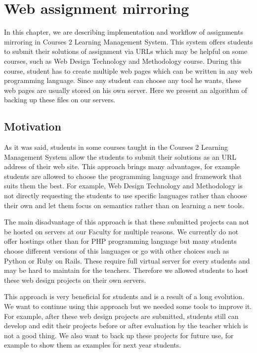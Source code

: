\chapter{Web assignment mirroring}
\label{sec:mirroring}

In this chapter, we are describing implementation and workflow of assignments mirroring in Courses 2 Learning Management System. This system offers students to submit their solutions of assignment via URLs which may be helpful on some courses, such as Web Design Technology and Methodology course. During this course, student has to create multiple web pages which can be written in any web programming language. Since any student can choose any tool he wants, these web pages are usually stored on his own server. Here we present an algorithm of backing up these files on our servers.

\section{Motivation}
As it was said, students in some courses taught in the Courses 2 Learning Management System allow the students to submit their solutions as an URL address of their web site. This approach brings many advantages, for example students are allowed to choose the programming language and framework that suits them the best. For example, Web Design Technology and Methodology is not directly requesting the students to use specific languages rather than choose their own and let them focus on semantics rather than on learning a new tools.

The main disadvantage of this approach is that these submitted projects can not be hosted on servers at our Faculty for multiple reasons. We currently do not offer hostings other than for PHP programming language but many students choose different versions of this languages or go with other choices such as Python or Ruby on Rails. These require full virtual server for every students and may be hard to maintain for the teachers. Therefore we allowed students to host these web design projects on their own servers.

This approach is very beneficial for students and is a result of a long evolution. We want to continue using this approach but we needed some tools to improve it. For example, after these web design projects are submitted, students still can develop and edit their projects before or after evaluation by the teacher which is not a good thing. We also want to back up these projects for future use, for example to show them as examples for next year students.

